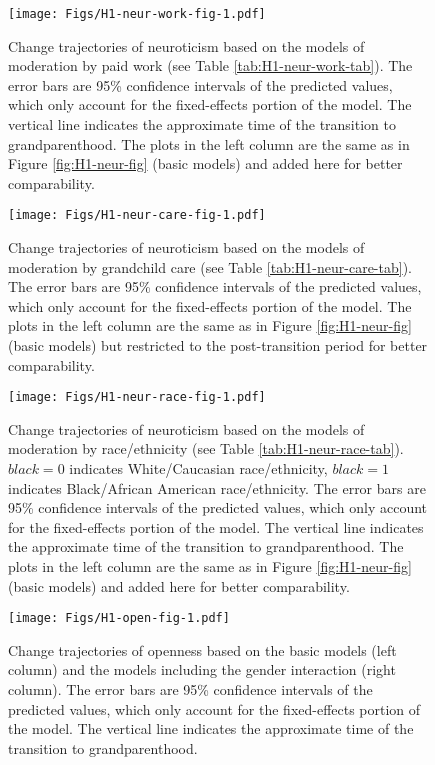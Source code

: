 \documentclass[
  english,
  man,floatsintext]{apa7}
\begin{document}
\begin{figure}
\centering
\texttt{[image: Figs/H1-neur-work-fig-1.pdf]}
\caption{\label{fig:H1-neur-work-fig}Change trajectories of neuroticism based on the models of moderation by paid work (see Table \ref{tab:H1-neur-work-tab}). The error bars are 95\% confidence intervals of the predicted values, which only account for the fixed-effects portion of the model. The vertical line indicates the approximate time of the transition to grandparenthood. The plots in the left column are the same as in Figure \ref{fig:H1-neur-fig} (basic models) and added here for better comparability.}
\end{figure}



\begin{figure}
\centering
\texttt{[image: Figs/H1-neur-care-fig-1.pdf]}
\caption{\label{fig:H1-neur-care-fig}Change trajectories of neuroticism based on the models of moderation by grandchild care (see Table \ref{tab:H1-neur-care-tab}). The error bars are 95\% confidence intervals of the predicted values, which only account for the fixed-effects portion of the model. The plots in the left column are the same as in Figure \ref{fig:H1-neur-fig} (basic models) but restricted to the post-transition period for better comparability.}
\end{figure}



\begin{figure}
\centering
\texttt{[image: Figs/H1-neur-race-fig-1.pdf]}
\caption{\label{fig:H1-neur-race-fig}Change trajectories of neuroticism based on the models of moderation by race/ethnicity (see Table \ref{tab:H1-neur-race-tab}). \(black=0\) indicates White/Caucasian race/ethnicity, \(black=1\) indicates Black/African American race/ethnicity. The error bars are 95\% confidence intervals of the predicted values, which only account for the fixed-effects portion of the model. The vertical line indicates the approximate time of the transition to grandparenthood. The plots in the left column are the same as in Figure \ref{fig:H1-neur-fig} (basic models) and added here for better comparability.}
\end{figure}



\begin{figure}
\centering
\texttt{[image: Figs/H1-open-fig-1.pdf]}
\caption{\label{fig:H1-open-fig}Change trajectories of openness based on the basic models (left column) and the models including the gender interaction (right column). The error bars are 95\% confidence intervals of the predicted values, which only account for the fixed-effects portion of the model. The vertical line indicates the approximate time of the transition to grandparenthood.}
\end{figure}
\end{document}
